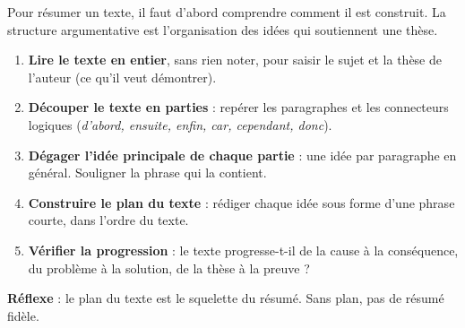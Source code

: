\documentclass[11pt]{article}
\begin{document}
\begin{methode}
Pour résumer un texte, il faut d'abord comprendre comment il est construit. La structure argumentative est l'organisation des idées qui soutiennent une thèse.
\begin{enumerate}
\item \textbf{Lire le texte en entier}, sans rien noter, pour saisir le sujet et la thèse de l'auteur (ce qu'il veut démontrer).
\item \textbf{Découper le texte en parties} : repérer les paragraphes et les connecteurs logiques (\emph{d'abord, ensuite, enfin, car, cependant, donc}).
\item \textbf{Dégager l'idée principale de chaque partie} : une idée par paragraphe en général. Souligner la phrase qui la contient.
\item \textbf{Construire le plan du texte} : rédiger chaque idée sous forme d'une phrase courte, dans l'ordre du texte.
\item \textbf{Vérifier la progression} : le texte progresse-t-il de la cause à la conséquence, du problème à la solution, de la thèse à la preuve ?
\end{enumerate}
\textbf{Réflexe} : le plan du texte est le squelette du résumé. Sans plan, pas de résumé fidèle.
\end{methode}
\end{document}
